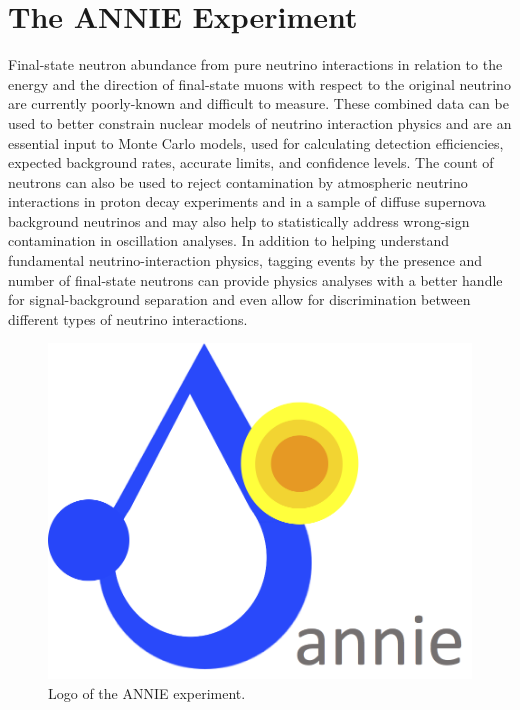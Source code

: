 
\chapter{The ANNIE Experiment}
\label{cha:2}

Final-state neutron abundance from pure neutrino interactions in relation to the energy %
and the direction of final-state muons with respect to the original neutrino %
are currently poorly-known and difficult to measure.
These combined data can be used to better constrain nuclear models of neutrino interaction %
physics and are an essential input to Monte Carlo models, used for calculating %
detection efficiencies, expected background rates, accurate limits, and confidence levels.
The count of neutrons can also be used to reject contamination by atmospheric %
neutrino interactions in proton decay experiments and in a sample of diffuse supernova %
background neutrinos and may also help to statistically address wrong-sign contamination %
in oscillation analyses.
In addition to helping understand fundamental neutrino-interaction physics, tagging events %
by the presence and number of final-state neutrons can provide physics analyses with a better %
handle for signal-background separation and even allow for discrimination between %
different types of neutrino interactions.

\begin{figure}
  \centering
  \includegraphics[scale=.2]{pics/logo_2}
  \caption{Logo of the ANNIE experiment.}
  \label{fig:logo}
\end{figure}

